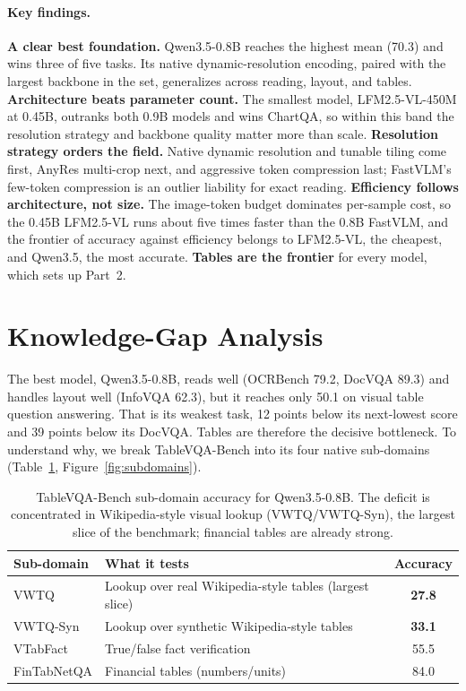 \documentclass{article}
\newcommand{\best}[1]{\textbf{#1}}
\begin{document}
\paragraph{Key findings.}
\textbf{A clear best foundation.} Qwen3.5-0.8B reaches the highest mean (70.3) and
wins three of five tasks. Its native dynamic-resolution encoding, paired with the
largest backbone in the set, generalizes across reading, layout, and tables.
\textbf{Architecture beats parameter count.} The smallest model, LFM2.5-VL-450M at
0.45B, outranks both 0.9B models and wins ChartQA, so within this band the
resolution strategy and backbone quality matter more than scale.
\textbf{Resolution strategy orders the field.} Native dynamic resolution and
tunable tiling come first, AnyRes multi-crop next, and aggressive token
compression last; FastVLM's few-token compression is an outlier liability for
exact reading. \textbf{Efficiency follows architecture, not size.} The image-token
budget dominates per-sample cost, so the 0.45B LFM2.5-VL runs about five times
faster than the 0.8B FastVLM, and the frontier of accuracy against efficiency
belongs to LFM2.5-VL, the cheapest, and Qwen3.5, the most accurate.
\textbf{Tables are the frontier} for every model, which sets up Part~2.

\section{Knowledge-Gap Analysis}
\label{sec:gap}

The best model, Qwen3.5-0.8B, reads well (OCRBench 79.2, DocVQA 89.3) and handles
layout well (InfoVQA 62.3), but it reaches only 50.1 on visual table question
answering. That is its weakest task, 12 points below its next-lowest score and 39
points below its DocVQA. Tables are therefore the decisive bottleneck. To
understand why, we break TableVQA-Bench into its four native sub-domains
(Table~\ref{tab:subdomains}, Figure~\ref{fig:subdomains}).

\begin{table}[t]
\caption{TableVQA-Bench sub-domain accuracy for Qwen3.5-0.8B. The deficit is
concentrated in Wikipedia-style visual lookup (VWTQ/VWTQ-Syn), the largest
slice of the benchmark; financial tables are already strong.}
\label{tab:subdomains}
\centering
\small
\begin{tabular}{@{}llc@{}}
\toprule
Sub-domain & What it tests & Accuracy \\
\midrule
VWTQ        & Lookup over real Wikipedia-style tables (largest slice) & \best{27.8} \\
VWTQ-Syn    & Lookup over synthetic Wikipedia-style tables            & \best{33.1} \\
VTabFact    & True/false fact verification                           & 55.5 \\
FinTabNetQA & Financial tables (numbers/units)                       & 84.0 \\
\bottomrule
\end{tabular}
\end{table}
\end{document}
